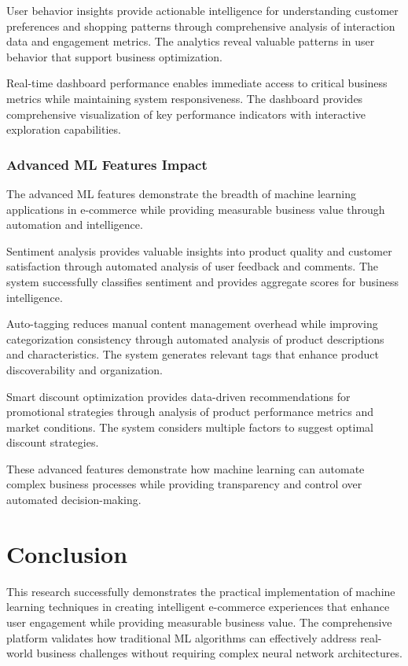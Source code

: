 \documentclass[12pt]{article}
\begin{document}
User behavior insights provide actionable intelligence for understanding customer preferences and shopping patterns through comprehensive analysis of interaction data and engagement metrics. The analytics reveal valuable patterns in user behavior that support business optimization.

Real-time dashboard performance enables immediate access to critical business metrics while maintaining system responsiveness. The dashboard provides comprehensive visualization of key performance indicators with interactive exploration capabilities.

\subsubsection{Advanced ML Features Impact}
The advanced ML features demonstrate the breadth of machine learning applications in e-commerce while providing measurable business value through automation and intelligence.

Sentiment analysis provides valuable insights into product quality and customer satisfaction through automated analysis of user feedback and comments. The system successfully classifies sentiment and provides aggregate scores for business intelligence.

Auto-tagging reduces manual content management overhead while improving categorization consistency through automated analysis of product descriptions and characteristics. The system generates relevant tags that enhance product discoverability and organization.

Smart discount optimization provides data-driven recommendations for promotional strategies through analysis of product performance metrics and market conditions. The system considers multiple factors to suggest optimal discount strategies.

These advanced features demonstrate how machine learning can automate complex business processes while providing transparency and control over automated decision-making.

\section{Conclusion}
This research successfully demonstrates the practical implementation of machine learning techniques in creating intelligent e-commerce experiences that enhance user engagement while providing measurable business value. The comprehensive platform validates how traditional ML algorithms can effectively address real-world business challenges without requiring complex neural network architectures.
\end{document}
